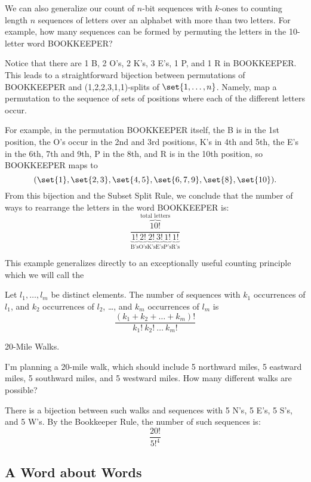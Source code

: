 We can also generalize our count of $n$-bit sequences with $k$-ones to
counting length $n$ sequences of letters over an alphabet with more than
two letters.  For example, how many sequences can be formed by permuting
the letters in the 10-letter word BOOKKEEPER?

Notice that there are 1 B, 2 O's, 2 K's, 3 E's, 1 P, and 1 R in
BOOKKEEPER.  This leads to a straightforward bijection between
permutations of BOOKKEEPER and (1,2,2,3,1,1)-splits of $\set{1,\dots,n}$.
Namely, map a permutation to the sequence of sets of positions where each
of the different letters occur.

For example, in the permutation BOOKKEEPER itself, the B is in the 1st
position, the O's occur in the 2nd and 3rd positions, K's in 4th and 5th,
the E's in the 6th, 7th and 9th, P in the 8th, and R is in the 10th
position, so BOOKKEEPER maps to
\[
(\set{1}, \set{2,3}, \set{4,5}, \set{6,7,9}, \set{8}, \set{10}).
\]
From this bijection and the Subset Split Rule, we conclude that the
number of ways to rearrange the letters in the word BOOKKEEPER is:
\[
\frac{\overbrace{10!}^{\text{total letters}}}{
\underbrace{1!}_{\text{B's}}
\underbrace{2!}_{\text{O's}}
\underbrace{2!}_{\text{K's}}
\underbrace{3!}_{\text{E's}}
\underbrace{1!}_{\text{P's}}
\underbrace{1!}_{\text{R's}}}
\]

This example generalizes directly to an exceptionally useful counting
principle which we will call the
\begin{mathrule}
Let $l_1, \ldots, l_m$ be distinct elements.  The number of sequences with
$k_1$ occurrences of $l_1$, and $k_2$ occurrences of $l_2$, \dots, and
$k_m$ occurrences of $l_m$ is
\[
\frac{(k_1 + k_2 + \ldots + k_m)!}{k_1!\ k_2!\ \ldots\ k_m!}
\]
\end{mathrule}

\begin{example*} 20-Mile Walks.

I'm planning a 20-mile walk, which should include 5 northward miles, 5
eastward miles, 5 southward miles, and 5 westward miles.  How many
different walks are possible?

There is a bijection between such walks and sequences with 5 N's, 5
E's, 5 S's, and 5 W's.  By the Bookkeeper Rule, the number of such
sequences is:
\[
\frac{20!}{5!^4}
\]
\end{example*}

\subsection{A Word about Words}

